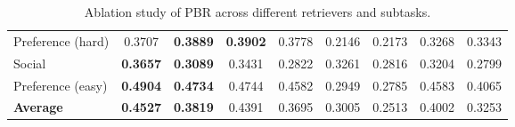\begin{table}[ht]
{\begin{tabular}{lcccccccc}
Preference (hard) & 0.3707 & \textbf{0.3889} & \textbf{0.3902} & 0.3778 & 0.2146 & 0.2173 & 0.3268 & 0.3343 \\
Social& \textbf{0.3657} & \textbf{0.3089} & 0.3431 & 0.2822 & 0.3261 & 0.2816 & 0.3204 & 0.2799 \\
Preference (easy) & \textbf{0.4904} & \textbf{0.4734} & 0.4744 & 0.4582 & 0.2949 & 0.2785 & 0.4583 & 0.4065 \\
\midrule
\textbf{Average} & \textbf{0.4527} & \textbf{0.3819} & 0.4391 & 0.3695 & 0.3005 & 0.2513 & 0.4002 & 0.3253 \\
\bottomrule
\end{tabular}
}
\caption{Ablation study of PBR across different retrievers and subtasks.}
\label{tab:ablation_results}
\end{table}

\begin{table}[ht]
\centering


\end{table}
